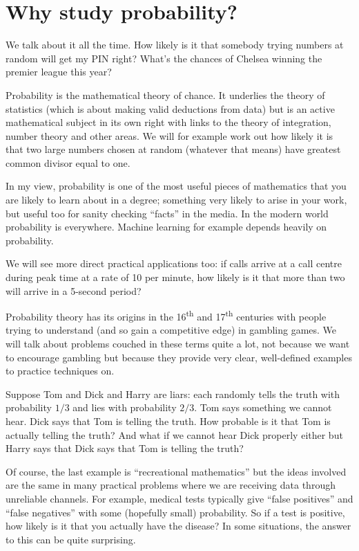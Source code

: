 \section{Why study probability?} 

We talk about it all the time. How likely is it that somebody trying numbers at random will get my PIN right? What's the chances of Chelsea winning the premier league this year?  

Probability is the mathematical theory of chance. It underlies the theory of statistics (which is about making valid deductions from data) but is an active mathematical subject in its own right with links to the theory of integration, number theory and other areas. We will for example work out how likely it is that two large numbers chosen at random (whatever that means) have greatest common divisor equal to one. 

In my view, probability is one of the most useful pieces of mathematics that you are likely to learn about in a degree; something very likely to arise in your work, but useful too for sanity checking ``facts'' in the media.  In the modern world probability is everywhere. Machine learning for example depends heavily on probability. 

We will see more direct practical applications too: if calls arrive at a call centre during peak time at a rate of 10 per minute, how likely is it that more than two will arrive in a 5-second period?  

Probability theory has its origins in the 16\textsuperscript{th} and 17\textsuperscript{th} centuries with people trying to understand (and so gain a competitive edge) in gambling games. We will talk about problems couched in these terms quite a lot, not because we want to encourage gambling but because they provide very clear, well-defined examples to practice techniques on. 

 Suppose Tom and Dick and Harry are liars: each randomly tells the truth with probability $1/3$ and lies with probability $2/3$. Tom says something we cannot hear. Dick says that Tom is telling the truth.  How probable is it that Tom is actually telling the truth?   And what if we cannot hear Dick properly either but Harry says that Dick says that Tom is telling the truth?   
 
 Of course, the last example is  ``recreational mathematics'' but the ideas involved are the same in many practical problems where we are receiving data through unreliable channels. For example, medical tests typically give ``false positives'' and ``false negatives'' with some (hopefully small) probability. So if a test is positive, how likely is it that you actually have the disease?  In some situations, the answer to this can be quite surprising. 